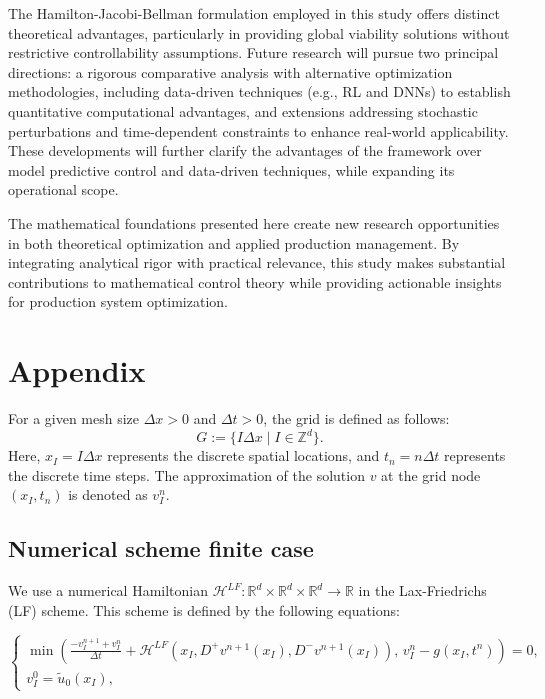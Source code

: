 \documentclass[]{interact}
\theoremstyle{plain}%
\theoremstyle{definition}
\theoremstyle{remark}
\begin{document}
The Hamilton-Jacobi-Bellman formulation employed in this study offers distinct theoretical advantages, particularly in providing global viability solutions without restrictive controllability assumptions. Future research will pursue two principal directions: a rigorous comparative analysis with alternative optimization methodologies, including data-driven techniques (e.g., RL and DNNs) to establish quantitative computational advantages, and extensions addressing stochastic perturbations and time-dependent constraints to enhance real-world applicability. These developments will further clarify the advantages of the framework over model predictive control and data-driven techniques, while expanding its operational scope.

The mathematical foundations presented here create new research opportunities in both theoretical optimization and applied production management. By integrating analytical rigor with practical relevance, this study makes substantial contributions to mathematical control theory while providing actionable insights for production system optimization.





\section{Appendix}\label{app}




For a given mesh size \(\Delta x > 0\) and \(\Delta t > 0\), the grid is defined as follows: \[ G:= \{ I \Delta x \mid I \in \mathbb{Z}^d \}. \] Here, \( x_I = I \Delta x \) represents the discrete spatial locations, and \( t_n = n \Delta t \) represents the discrete time steps. The approximation of the solution \( v \) at the grid node \((x_I, t_n)\) is denoted as \( v^n_I \). 

\subsection{Numerical scheme finite case }

We use a numerical Hamiltonian \(\mathcal{H}^{LF} : \mathbb{R}^d \times \mathbb{R}^d \times \mathbb{R}^d \to \mathbb{R}\) in the Lax-Friedrichs (LF) scheme. This scheme is defined by the following equations:

 \begin{equation}\label{LF} \begin{cases} \min \left( \frac{-v_I^{n+1} + v_I^n}{\Delta t} + \mathcal{H}^{LF}(x_I, D^+v^{n+1}(x_I), D^-v^{n+1}(x_I)), \, v_I^{n} - g(x_I, t^{n}) \right) = 0, \\ v_I^0 = \tilde{u}_0(x_I), \end{cases} 
 \end{equation} 
 
\end{document}
